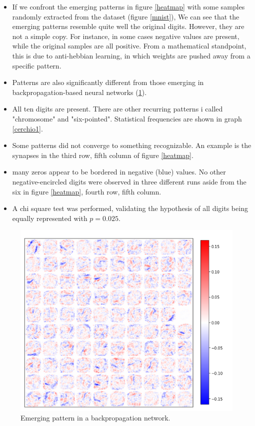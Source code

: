 \documentclass[a4paper]{report}
\begin{document}
\begin{itemize}
    \item If we confront the emerging patterns in figure \ref{heatmap} with some samples randomly extracted from the dataset (figure \ref{mnist}), We can see that the emerging patterns resemble quite well the original digits. However, they are not a simple copy. For instance, in some cases negative values are present, while the original samples are all positive. From a mathematical standpoint, this is due to anti-hebbian learning, in which weights are pushed away from a specific pattern.
    \item Patterns are also significantly different from those emerging in backpropagation-based neural networks (\ref{backnet}).
    \item All ten digits are present. There are other recurring patterns i called "chromosome" and "six-pointed". Statistical frequencies are shown in graph \ref{cerchio1}.
    \item Some patterns did not converge to something recognizable. An example is the synapses in the third row, fifth column of figure \ref{heatmap}.
    \item many zeros appear to be bordered in negative (blue) values. No other negative-encircled digits were observed in three different runs aside from the six in figure \ref{heatmap}, fourth row, fifth column.
    \item A chi square test was performed, validating the hypothesis of all digits being equally represented with $p  = 0.025$.
    \end{itemize}

\begin{figure} [H]
    \centering
    \includegraphics [width = 12cm] {h/backnet.png}
    \caption{Emerging pattern in a backpropagation network.}
    \label{backnet}
\end{figure}
\end{document}
